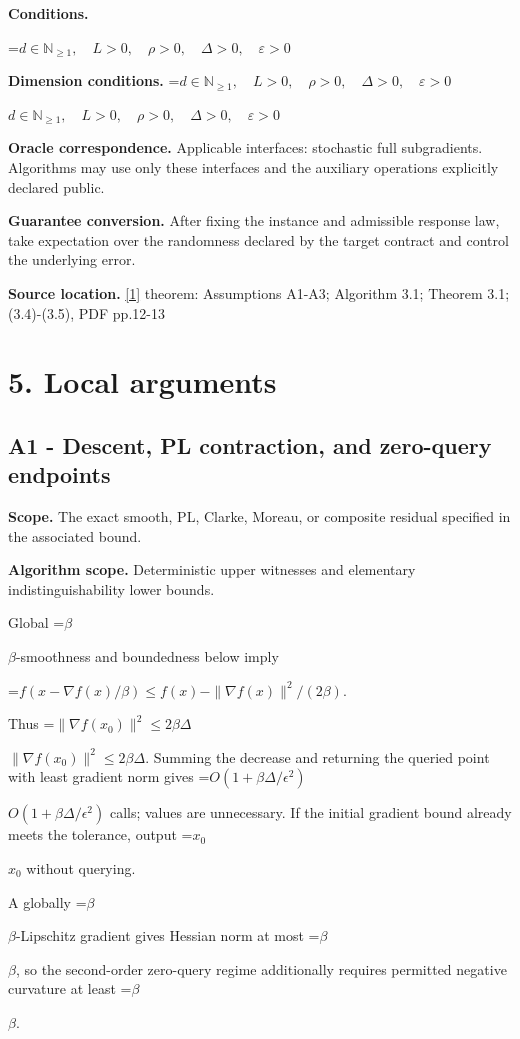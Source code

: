 \documentclass[10pt,a4paper]{article}
\newcommand{\AtlasMath}[1]{\par\begingroup\centering\setbox0=\hbox{$\displaystyle #1$}\ifdim\wd0>1.4\linewidth\typeout{ATLAS WIDE FORMULA: \the\wd0}\fi\ifdim\wd0>\linewidth\resizebox{\linewidth}{!}{\box0}\else\box0\fi\par\endgroup}
\newcommand{\AtlasInlineMath}[1]{\begingroup\setbox0=\hbox{$#1$}\ifdim\wd0>.4\linewidth\endgroup\AtlasMath{#1}\else\endgroup$#1$\fi}
\begin{document}
\textbf{Conditions.} 
\AtlasMath{d\in\mathbb{N}_{\ge1},\quad L>0,\quad \rho>0,\quad \Delta>0,\quad \varepsilon>0}


\textbf{Dimension conditions.} \AtlasInlineMath{d\in\mathbb{N}_{\ge1},\quad L>0,\quad \rho>0,\quad \Delta>0,\quad \varepsilon>0}

\textbf{Oracle correspondence.} Applicable interfaces: stochastic full subgradients. Algorithms may use only these interfaces and the auxiliary operations explicitly declared public.

\textbf{Guarantee conversion.} After fixing the instance and admissible response law, take expectation over the randomness declared by the target contract and control the underlying error.

\textbf{Source location.} \href{https://sites.math.washington.edu/~ddrusv/combined_model_based.pdf}{[1]} theorem: Assumptions A1-A3; Algorithm 3.1; Theorem 3.1; (3.4)-(3.5), PDF pp.12-13

\section{5. Local arguments}
\subsection{A1 - Descent, PL contraction, and zero-query endpoints}
\textbf{Scope.} The exact smooth, PL, Clarke, Moreau, or composite residual specified in the associated bound.

\textbf{Algorithm scope.} Deterministic upper witnesses and elementary indistinguishability lower bounds.

Global \AtlasInlineMath{\beta}-smoothness and boundedness below imply

\AtlasMath{f(x-\nabla f(x)/\beta)\le f(x)-\|\nabla f(x)\|^2/(2\beta).}

Thus \AtlasInlineMath{\|\nabla f(x_0)\|^2\le2\beta\Delta}. Summing the decrease and returning the queried point with least gradient norm gives \AtlasInlineMath{O(1+\beta\Delta/\epsilon^2)} calls; values are unnecessary. If the initial gradient bound already meets the tolerance, output \AtlasInlineMath{x_0} without querying.

A globally \AtlasInlineMath{\beta}-Lipschitz gradient gives Hessian norm at most \AtlasInlineMath{\beta}, so the second-order zero-query regime additionally requires permitted negative curvature at least \AtlasInlineMath{\beta}.
\end{document}
